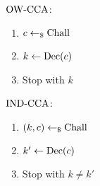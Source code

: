 \parbox[t]{3.5cm}{%
    ${\mathrm{OW}\text{-}\mathrm{CCA}}$:
    \begin{enumerate}[topsep=0pt]
        \item $c\gets_\$\mathrm{Chall}$
        \item $k\gets\mathrm{Dec}(c)$
        \item Stop with $k$
    \end{enumerate}    
}\parbox[t]{3.5cm}{%
    ${\mathrm{IND}\text{-}\mathrm{CCA}}$:
    \begin{enumerate}[topsep=0pt]
        \item $(k,c)\gets_\$\mathrm{Chall}$
        \item $k'\gets\mathrm{Dec}(c)$
        \item Stop with $k\not= k'$
    \end{enumerate}
} 